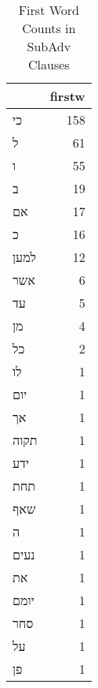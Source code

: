 \begin{table}[htbp!]
\centering
\caption{First Word Counts in SubAdv Clauses}
\label{table:SubAdv_front}
\begin{tabular}{lr}
\toprule
{} &  firstw \\
\midrule
\texthebrew{כי}   &     158 \\
\texthebrew{ל}    &      61 \\
\texthebrew{ו}    &      55 \\
\texthebrew{ב}    &      19 \\
\texthebrew{אם}   &      17 \\
\texthebrew{כ}    &      16 \\
\texthebrew{למען} &      12 \\
\texthebrew{אשר}  &       6 \\
\texthebrew{עד}   &       5 \\
\texthebrew{מן}   &       4 \\
\texthebrew{כל}   &       2 \\
\texthebrew{לו}   &       1 \\
\texthebrew{יום}  &       1 \\
\texthebrew{אך}   &       1 \\
\texthebrew{תקוה} &       1 \\
\texthebrew{ידע}  &       1 \\
\texthebrew{תחת}  &       1 \\
\texthebrew{שאף}  &       1 \\
\texthebrew{ה}    &       1 \\
\texthebrew{נעים} &       1 \\
\texthebrew{את}   &       1 \\
\texthebrew{יומם} &       1 \\
\texthebrew{סחר}  &       1 \\
\texthebrew{על}   &       1 \\
\texthebrew{פן}   &       1 \\
\bottomrule
\end{tabular}
\end{table}
